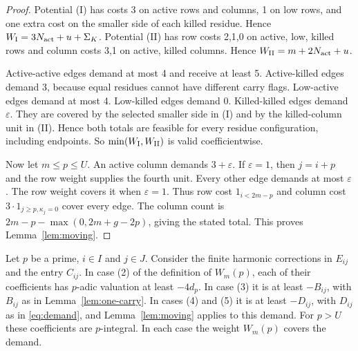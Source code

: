 \begin{proof}
Potential (I) has costs 3 on active rows and columns, 1 on low rows, and one extra cost on the smaller side of each killed residue. Hence \(W_{\rm I}=3N_{\rm act}+u+\Sigma_K\). Potential (II) has row costs 2,1,0 on active, low, killed rows and column costs 3,1 on active, killed columns. Hence \(W_{\rm II}=m+2N_{\rm act}+u\).

Active-active edges demand at most 4 and receive at least 5. Active-killed edges demand 3, because equal residues cannot have different carry flags. Low-active edges demand at most 4. Low-killed edges demand 0. Killed-killed edges demand \(\varepsilon\). They are covered by the selected smaller side in (I) and by the killed-column unit in (II). Hence both totals are feasible for every residue configuration, including endpoints. So \(\min(W_{\rm I},W_{\rm II})\) is valid coefficientwise.

Now let \(m\le p\le U\). An active column demands \(3+\varepsilon\). If \(\varepsilon=1\), then \(j=i+p\) and the row weight supplies the fourth unit. Every other edge demands at most \(\varepsilon\). The row weight covers it when \(\varepsilon=1\). Thus row cost \(1_{i<2m-p}\) and column cost \(3\cdot1_{j\ge p,\kappa_j=0}\) cover every edge. The column count is \(2m-p-\max(0,2m+g-2p)\), giving the stated total. This proves Lemma~\ref{lem:moving}.
\end{proof}

\begin{lemma}\label{lem:harmonic}
Let \(p\) be a prime, \(i\in I\) and \(j\in J\). Consider the finite harmonic corrections in \(E_{ij}\) and the entry \(C_{ij}\). In case (2) of the definition of \(W_m(p)\), each of their coefficients has \(p\)-adic valuation at least \(-4d_p\). In case (3) it is at least \(-B_{ij}\), with \(B_{ij}\) as in Lemma~\ref{lem:one-carry}. In cases (4) and (5) it is at least \(-D_{ij}\), with \(D_{ij}\) as in \eqref{eq:demand}, and Lemma~\ref{lem:moving} applies to this demand. For \(p>U\) these coefficients are \(p\)-integral. In each case the weight \(W_m(p)\) covers the demand.
\end{lemma}

